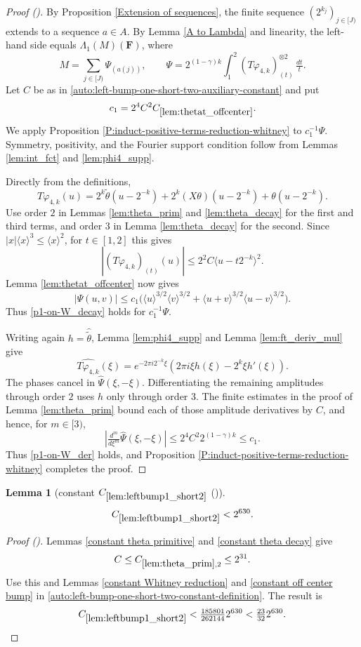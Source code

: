 \documentclass[12pt,reqno]{amsart}
\newcommand{\auto}{{({\tiny\faCar})}}
\theoremstyle{plain}
\newtheorem{lemma}[theorem]{Lemma}
\numberwithin{equation}{section}
\theoremstyle{remark}
\newcommand{\uses}[1]{}
\newcommand{\usesdefs}[1]{}
\newcommand{\F}{\mathbf{F}}
\begin{document}
\begin{proof}[Proof \auto]
By Proposition \ref{Extension of sequences}, the finite sequence $(2^{k_j})_{j\in[J)}$ extends to a sequence $a\in A$. By Lemma \ref{A to Lambda} and linearity, the left-hand side equals $\Lambda_1(M)(\F)$, where
\[
M=\sum_{j\in[J)}\Psi_{(a(j))},
\qquad
\Psi=2^{(1-\gamma)k}\int_1^2(T\varphi_{4,k})_{(t)}^{\otimes2}\,\tfrac{dt}{t}.
\]
Let $C$ be as in \eqref{auto:left-bump-one-short-two-auxiliary-constant} and put
\[
c_1=2^4C^2C_{\ref{lem:thetat_offcenter}}.
\]
We apply Proposition \ref{P:induct-positive-terms-reduction-whitney} to $c_1^{-1}\Psi$. Symmetry, positivity, and the Fourier support condition follow from Lemmas \ref{lem:int_fct} and \ref{lem:phi4_supp}.

Directly from the definitions,
\[
T\varphi_{4,k}(u)
=2^k\widetilde\theta(u-2^{-k})
+2^k(X\theta)(u-2^{-k})
+\theta(u-2^{-k}).
\]
Use order $2$ in Lemmas \ref{lem:theta_prim} and \ref{lem:theta_decay} for the first and third terms, and order $3$ in Lemma \ref{lem:theta_decay} for the second. Since $|x|\langle x\rangle^3\le\langle x\rangle^2$, for $t\in[1,2]$ this gives
\[
|(T\varphi_{4,k})_{(t)}(u)|
\le2^2C\langle u-t2^{-k}\rangle^2.
\]
Lemma \ref{lem:thetat_offcenter} now gives
\[
|\Psi(u,v)|
\le c_1\bigl(
\langle u\rangle^{3/2}\langle v\rangle^{3/2}
+\langle u+v\rangle^{3/2}\langle u-v\rangle^{3/2}
\bigr).
\]
Thus \eqref{p1-on-W_decay} holds for $c_1^{-1}\Psi$.

Writing again $h=\widehat{\widetilde\theta}$, Lemma \ref{lem:phi4_supp} and Lemma \ref{lem:ft_deriv_mul} give
\[
\widehat{T\varphi_{4,k}}(\xi)
=e^{-2\pi i2^{-k}\xi}
\left(2\pi i\xi h(\xi)-2^k\xi h'(\xi)\right).
\]
The phases cancel in $\widehat\Psi(\xi,-\xi)$. Differentiating the remaining amplitudes through order $2$ uses $h$ only through order $3$. The finite estimates in the proof of Lemma \ref{lem:theta_prim} bound each of those amplitude derivatives by $C$, and hence, for $m\in[3)$,
\[
\left|\tfrac{d^m}{d\xi^m}\widehat\Psi(\xi,-\xi)\right|
\le2^4C^2 2^{(1-\gamma)k}
\le c_1.
\]
Thus \eqref{p1-on-W_der} holds, and Proposition \ref{P:induct-positive-terms-reduction-whitney} completes the proof.
\end{proof}

\begin{lemma}[constant $C_{\ref{lem:leftbump1_short2}}$ \auto]\label{constant left bump one short two}\uses{lem:theta_prim,constant theta primitive,constant theta decay,constant Whitney reduction,constant off center bump,lem:leftbump1_short2}\usesdefs{}
\begin{equation}\label{constant left bump one short two bound}
C_{\ref{lem:leftbump1_short2}}
<2^{630}.
\end{equation}
\end{lemma}
\begin{proof}[Proof \auto]
Lemmas \ref{constant theta primitive} and \ref{constant theta decay} give
\[
C\le C_{\ref{lem:theta_prim},2}\le2^{31}.
\]
Use this and Lemmas \ref{constant Whitney reduction} and \ref{constant off center bump} in \eqref{auto:left-bump-one-short-two-constant-definition}. The result is
\[
C_{\ref{lem:leftbump1_short2}}
<\tfrac{185801}{262144}2^{630}
<\tfrac{23}{32}2^{630}.
\]
\end{proof}
\end{document}
